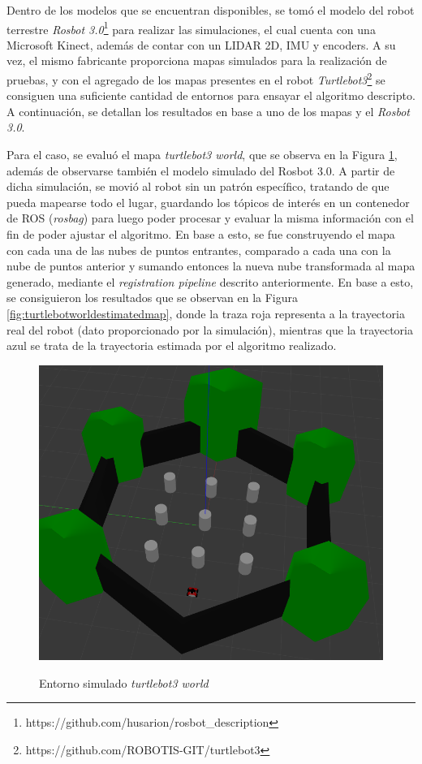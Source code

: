 Dentro de los modelos que se encuentran disponibles, se tomó el modelo del robot terrestre  \textit{Rosbot 3.0}\footnote{https://github.com/husarion/rosbot\_description} para realizar las simulaciones, el cual cuenta con una Microsoft Kinect, además de contar con un LIDAR 2D, IMU y encoders. A su vez, el mismo fabricante proporciona mapas simulados para la realización de pruebas, y con el agregado de los mapas presentes en el robot \textit{Turtlebot3}\footnote{https://github.com/ROBOTIS-GIT/turtlebot3} se consiguen una suficiente cantidad de entornos para ensayar el algoritmo descripto. A continuación, se detallan los resultados en base a uno de los mapas y el \textit{Rosbot 3.0}.

Para el caso, se evaluó el mapa \textit{turtlebot3 world}, que se observa en la Figura \ref{fig:turtlebotworldoriginalmap}, además de observarse también el modelo simulado del Rosbot 3.0. A partir de dicha simulación, se movió al robot sin un patrón específico, tratando de que pueda mapearse todo el lugar, guardando los tópicos de interés en un contenedor de ROS (\textit{rosbag}) para luego poder procesar y evaluar la misma información con el fin de poder ajustar el algoritmo. En base a esto, se fue construyendo el mapa con cada una de las nubes de puntos entrantes, comparado a cada una con la nube de puntos anterior y sumando entonces la nueva nube transformada al mapa generado, mediante el \textit{registration pipeline} descrito anteriormente. En base a esto, se consiguieron los resultados que se observan en la Figura \ref{fig:turtlebotworldestimatedmap}, donde la traza roja representa a la trayectoria real del robot (dato proporcionado por la simulación), mientras que la trayectoria azul se trata de la trayectoria estimada por el algoritmo realizado.
\begin{figure}[!ht]
    \centering
    {\includegraphics[width=\linewidth]{Img/TurtleBotWorldMap3D.png}}
    \caption{Entorno simulado \textit{turtlebot3 world}}
    \label{fig:turtlebotworldoriginalmap}
\end{figure}
